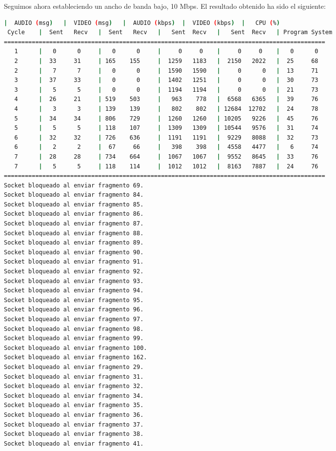 \vspace{\baselineskip}

\newpage
Seguimos ahora estableciendo un ancho de banda bajo, 10 Mbps. El resultado obtenido ha sido el siguiente:
\vspace{\baselineskip}
\begin{adjustbox}{max width=\textwidth}
\begin{lstlisting}[language=bash,basicstyle=\ttfamily\scriptsize]
          |  AUDIO (msg)   |  VIDEO (msg)   |  AUDIO (kbps)  |  VIDEO (kbps)  |   CPU (%)
 Cycle    |  Sent   Recv   |  Sent   Recv   |   Sent  Recv   |   Sent  Recv   | Program System
============================================================================================
   1      |   0      0     |   0      0     |     0     0    |     0     0    |   0      0
   2      |  33     31     | 165    155     |  1259   1183   |  2150   2022   |  25     68
   2      |   7      7     |   0      0     |  1590   1590   |     0      0   |  13     71
   3      |  37     33     |   0      0     |  1402   1251   |     0      0   |  30     73
   3      |   5      5     |   0      0     |  1194   1194   |     0      0   |  21     73
   4      |  26     21     | 519    503     |   963    778   |  6568   6365   |  39     76
   4      |   3      3     | 139    139     |   802    802   | 12684  12702   |  24     78
   5      |  34     34     | 806    729     |  1260   1260   | 10205   9226   |  45     76
   5      |   5      5     | 118    107     |  1309   1309   | 10544   9576   |  31     74
   6      |  32     32     | 726    636     |  1191   1191   |  9229   8088   |  32     73
   6      |   2      2     |  67     66     |   398    398   |  4558   4477   |   6     74
   7      |  28     28     | 734    664     |  1067   1067   |  9552   8645   |  33     76
   7      |   5      5     | 118    114     |  1012   1012   |  8163   7887   |  24     76
============================================================================================
Socket bloqueado al enviar fragmento 69.
Socket bloqueado al enviar fragmento 84.
Socket bloqueado al enviar fragmento 85.
Socket bloqueado al enviar fragmento 86.
Socket bloqueado al enviar fragmento 87.
Socket bloqueado al enviar fragmento 88.
Socket bloqueado al enviar fragmento 89.
Socket bloqueado al enviar fragmento 90.
Socket bloqueado al enviar fragmento 91.
Socket bloqueado al enviar fragmento 92.
Socket bloqueado al enviar fragmento 93.
Socket bloqueado al enviar fragmento 94.
Socket bloqueado al enviar fragmento 95.
Socket bloqueado al enviar fragmento 96.
Socket bloqueado al enviar fragmento 97.
Socket bloqueado al enviar fragmento 98.
Socket bloqueado al enviar fragmento 99.
Socket bloqueado al enviar fragmento 100.
Socket bloqueado al enviar fragmento 162.
Socket bloqueado al enviar fragmento 29.
Socket bloqueado al enviar fragmento 31.
Socket bloqueado al enviar fragmento 32.
Socket bloqueado al enviar fragmento 34.
Socket bloqueado al enviar fragmento 35.
Socket bloqueado al enviar fragmento 36.
Socket bloqueado al enviar fragmento 37.
Socket bloqueado al enviar fragmento 38.
Socket bloqueado al enviar fragmento 41.


\end{lstlisting}
\end{adjustbox}

